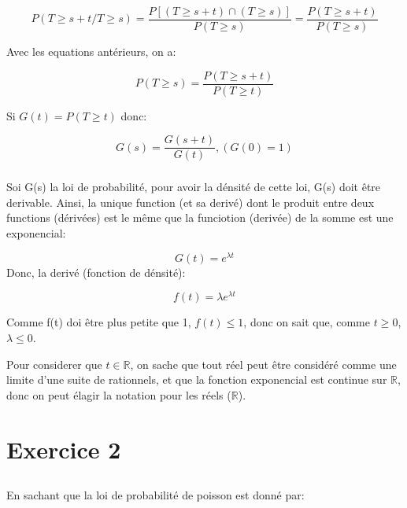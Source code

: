 \documentclass[a4paper]{article}
\begin{document}
\begin{equation}
P(T\geq s+t/ T\geq s)=\frac{P[(T\geq s+t )\cap (T \geq s)]}{P(T\geq s )}=\frac{P(T\geq s+t )}{P(T\geq s )}
\end{equation}

Avec les equations antérieurs, on a: 

\begin{equation}
P(T\geq s )=\frac{P(T\geq s+t )}{P(T\geq t )}
\end{equation}

Si $G(t)=P(T\geq t )$ donc: 

\begin{equation}
G(s)=\frac{G(s+t)}{G(t)}, (G(0)= 1)
\end{equation}

\subsubsection{}
Soi G(s) la  loi de probabilité, pour  avoir la dénsité de cette  loi, G(s) doit
être derivable. Ainsi, la unique function (et sa derivé) dont le produit entre deux
functions (dérivées) est le même que la funciotion (derivée) de la somme est une
exponencial:

\begin{equation}
G(t)=e^{\lambda t}
\end{equation}
Donc, la derivé (fonction de dénsité):

\begin{equation}
f(t)=\lambda e^{\lambda t}
\end{equation}

Comme f(t)  doi être plus petite  que 1, $f(t)\leq  1$, donc on sait  que, comme
$t\geq 0$, $\lambda \leq 0$.

Pour  considerer que  $t  \in \mathbb{R}$,  on  sache que  tout  réel peut  être
considéré  comme  une limite  d'une  suite de  rationnels,  et  que la  fonction
exponencial est continue sur $\mathbb{R}$,  donc on peut élagir la notation pour
les réels ($\mathbb{R}$).

\section{Exercice 2 }


\subsection{}
En sachant que la loi de probabilité de poisson est donné par:
\end{document}
